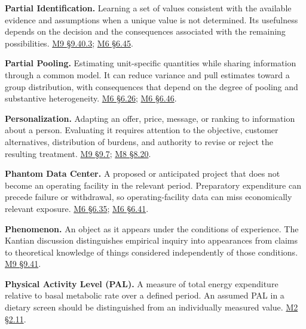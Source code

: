 \noindent\textbf{Partial Identification.} Learning a set of values consistent
with the available evidence and assumptions when a unique value is not
determined. Its usefulness depends on the decision and the consequences
associated with the remaining possibilities.
\hyperref[M09-compatibility-identification-and-valuation]{M9
§9.40.3};
\href{Marketing_Analytics_Lecture_Notes.pdf\#M06-evidence-for-action-before-precise-identification}{M6
§6.45}.

\noindent\textbf{Partial Pooling.} Estimating unit-specific quantities while
sharing information through a common model. It can reduce variance and
pull estimates toward a group distribution, with consequences that
depend on the degree of pooling and substantive heterogeneity.
\href{Marketing_Analytics_Lecture_Notes.pdf\#M06-store-decisions-and-partial-pooling}{M6
§6.26};
\href{Marketing_Analytics_Lecture_Notes.pdf\#M06-greater-precision-and-fewer-detected-harms}{M6
§6.46}.

\noindent\textbf{Personalization.} Adapting an offer, price, message, or ranking
to information about a person. Evaluating it requires attention to the
objective, customer alternatives, distribution of burdens, and authority
to revise or reject the resulting treatment.
\hyperref[M09-personalization-learning-and-the-ability-to-revise-a-goal]{M9
§9.7};
\href{Marketing_Analytics_Lecture_Notes.pdf\#M08-ai-experimentation-and-personalized-pricing}{M8
§8.20}.

\noindent\textbf{Phantom Data Center.} A proposed or anticipated project that
does not become an operating facility in the relevant period.
Preparatory expenditure can precede failure or withdrawal, so
operating-facility data can miss economically relevant exposure.
\href{Marketing_Analytics_Lecture_Notes.pdf\#M06-institutional-exposure-and-the-meaning-of-an-untreated-utility}{M6
§6.35};
\href{Marketing_Analytics_Lecture_Notes.pdf\#M06-phantom-projects-and-the-meaning-of-a-control}{M6
§6.41}.

\noindent\textbf{Phenomenon.} An object as it appears under the conditions of
experience. The Kantian discussion distinguishes empirical inquiry into
appearances from claims to theoretical knowledge of things considered
independently of those conditions.
\hyperref[M09-phenomena-noumena-and-the-ends-of-analysis]{M9
§9.41}.

\noindent\textbf{Physical Activity Level (PAL).} A measure of total energy
expenditure relative to basal metabolic rate over a defined period. An
assumed PAL in a dietary screen should be distinguished from an
individually measured value.
\href{Marketing_Analytics_Lecture_Notes.pdf\#M02-mhealth-nutrition-knowledge-and-sample-restrictions}{M2
§2.11}.

